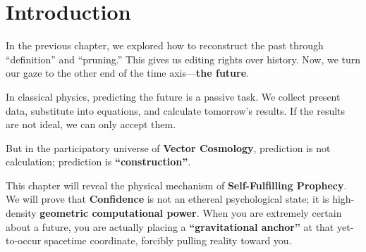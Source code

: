 \section{Introduction}

In the previous chapter, we explored how to reconstruct the past through ``definition'' and ``pruning.'' This gives us editing rights over history. Now, we turn our gaze to the other end of the time axis---\textbf{the future}.

In classical physics, predicting the future is a passive task. We collect present data, substitute into equations, and calculate tomorrow's results. If the results are not ideal, we can only accept them.

But in the participatory universe of \textbf{Vector Cosmology}, prediction is not calculation; prediction is \textbf{``construction''}.

This chapter will reveal the physical mechanism of \textbf{Self-Fulfilling Prophecy}. We will prove that \textbf{Confidence} is not an ethereal psychological state; it is high-density \textbf{geometric computational power}. When you are extremely certain about a future, you are actually placing a \textbf{``gravitational anchor''} at that yet-to-occur spacetime coordinate, forcibly pulling reality toward you.

